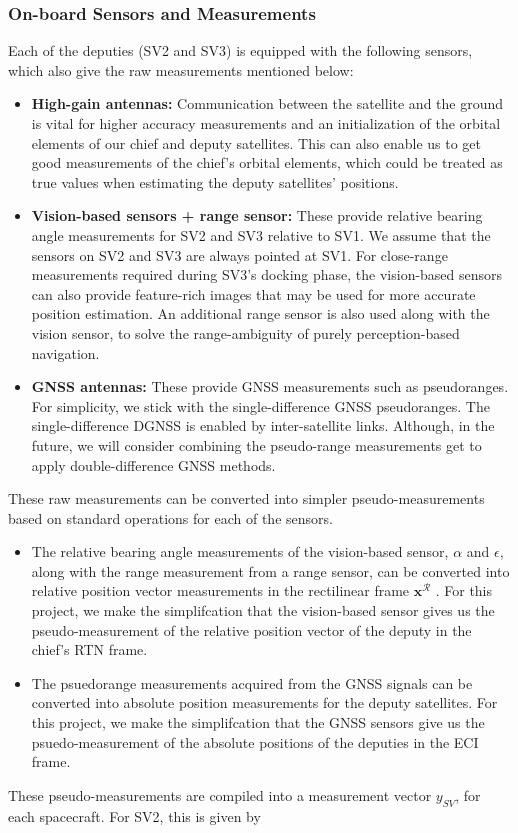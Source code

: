\subsubsection{On-board Sensors and Measurements}

Each of the deputies (SV2 and SV3) is equipped with the following sensors, which also give the raw measurements mentioned below:
\begin{itemize}
    \item \textbf{High-gain antennas:} Communication between the satellite and the ground is vital for higher accuracy measurements and an initialization of the orbital elements of our chief and deputy satellites. This can also enable us to get good measurements of the chief's orbital elements, which could be treated as true values when estimating the deputy satellites' positions.
    \item \textbf{Vision-based sensors + range sensor:} These provide relative bearing angle measurements for SV2 and SV3 relative to SV1. We assume that the sensors on SV2 and SV3 are always pointed at SV1. For close-range measurements required during SV3's docking phase, the vision-based sensors can also provide feature-rich images that may be used for more accurate position estimation. An additional range sensor is also used along with the vision sensor, to solve the range-ambiguity of purely perception-based navigation.
    \item \textbf{GNSS antennas:} These provide GNSS measurements such as pseudoranges. For simplicity, we stick with the single-difference GNSS pseudoranges. The single-difference DGNSS is enabled by inter-satellite links. Although, in the future, we will consider combining the pseudo-range measurements get to apply double-difference GNSS methods.
\end{itemize}

These raw measurements can be converted into simpler pseudo-measurements based on standard operations for each of the sensors. 
\begin{itemize}
    \item The relative bearing angle measurements of the vision-based sensor, $\alpha$ and $\epsilon$, along with the range measurement from a range sensor, can be converted into relative position vector measurements in the rectilinear frame $\boldsymbol{x}^\mathcal{R}$ \cite{sullivan2020nonlinear}. For this project, we make the simplifcation that the vision-based sensor gives us the pseudo-measurement of the relative position vector of the deputy in the chief's RTN frame.
    \item The psuedorange measurements acquired from the GNSS signals can be converted into absolute position measurements for the deputy satellites. For this project, we make the simplifcation that the GNSS sensors give us the psuedo-measurement of the absolute positions of the deputies in the ECI frame.
\end{itemize}
These pseudo-measurements are compiled into a measurement vector $y_{SV}$, for each spacecraft. For SV2, this is given by

